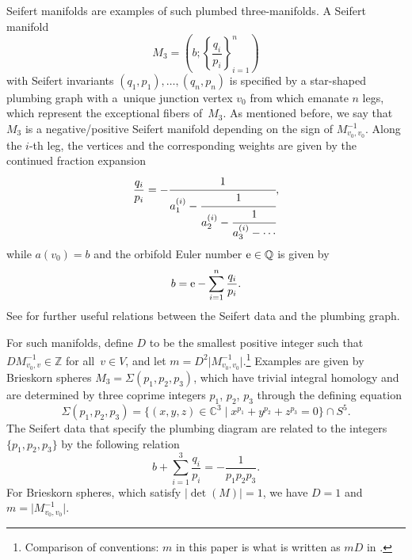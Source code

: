 \documentclass[10pt,a4paper]{amsart}
\theoremstyle{definition}
\numberwithin{equation}{section}
\begin{document}
Seifert manifolds are examples of such plumbed three-manifolds. A Seifert manifold
\begin{equation*}
 M_3=\left(b;\left\{\frac{q_i}{p_i}\right\}_{i=1}^{n}\right)
\end{equation*}
with Seifert invariants $(q_1,p_1), \ldots, (q_n, p_n)$ is specified by a star-shaped plumbing graph with a~unique junction vertex $v_0$ from which emanate $n$ legs, which represent the exceptional fibers of~$M_3$. As mentioned before, we say that $M_3$ is a negative/positive Seifert manifold depending on the sign of $M^{-1}_{v_0,v_0}$. Along the $i$-th leg, the vertices  and the corresponding weights 
are given by the continued fraction expansion
\begin{equation}
 \label{eqn:ctndfrac}
 \frac{q_i}{p_i}=-\cfrac{1}{a_{1}^{(i)}-\cfrac{1}{a^{(i)}_2-
 \cfrac{1}{a^{(i)}_3-\cdots}}},
\end{equation}
while $a(v_0)=b$ and the orbifold Euler number ${\rm e} \in \mathbb{Q}$ is given by
\begin{equation*}
 b={\rm e}-\sum\limits_{i=1}^n \frac{q_i}{p_i} .
\end{equation*}
See \cite[Appendix A]{chengUpC} for further useful relations between the Seifert data and the plumbing graph.

For such manifolds, define $D$ to be the smallest positive integer such that $DM_{v_0,v}^{-1}\in {\mathbb Z}$ for all~$v\in V$, and let $m=D^{2} \big\lvert M_{v_0,v_0}^{-1}\big\lvert$.\footnote{Comparison of conventions: $m$ in this paper is what is written as $mD$ in \cite{chengUpC}.} Examples are given by Brieskorn spheres $M_3 = \Sigma(p_1,p_2,p_3)$, which have trivial integral homology and are determined by three coprime integers $p_1$, $p_2$, $p_3$ through the defining equation
\begin{equation}\label{dfn:brieskorn}
 \Sigma(p_1,p_2,p_3)=
\bigl\{(x,y,z)\in\mathbb{C}^3 \mid x^{p_1}+y^{p_2}+z^{p_3} =0 \bigr\} \cap S^5 .
\end{equation}
The Seifert data that specify the plumbing diagram are related to the integers $\{ p_1,p_2,p_3 \}$ by the following relation
\begin{equation*}
 b+\sum_{i=1}^3 \frac{q_i}{p_i} =- \frac{1}{p_1p_2p_3}.
\end{equation*}
For Brieskorn spheres, which satisfy $\lvert \det (M)\lvert =1$, we have $D=1$ and $m= \big\lvert M_{v_0,v_0}^{-1}\big\lvert$.
\end{document}
